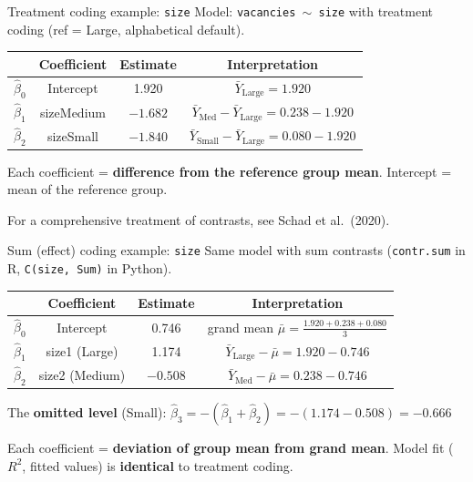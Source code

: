 \documentclass[10pt,ignorenonframetext,aspectratio=169]{beamer}
\begin{document}
\begin{frame}{Treatment coding example: \texttt{size}}
    Model: \texttt{vacancies $\sim$ size} with treatment coding (ref = Large, alphabetical default).

    \begin{table}[h]\centering\small
    \begin{tabular}{lccc}
    \hline
    & \textbf{Coefficient} & \textbf{Estimate} & \textbf{Interpretation} \\
    \hline
    $\hat{\beta}_0$ & Intercept & 1.920 & $\bar{Y}_{\text{Large}} = 1.920$ \\
    $\hat{\beta}_1$ & sizeMedium & $-1.682$ & $\bar{Y}_{\text{Med}} - \bar{Y}_{\text{Large}} = 0.238 - 1.920$ \\
    $\hat{\beta}_2$ & sizeSmall & $-1.840$ & $\bar{Y}_{\text{Small}} - \bar{Y}_{\text{Large}} = 0.080 - 1.920$ \\
    \hline
    \end{tabular}
    \end{table}

    \medskip
    Each coefficient = \textbf{difference from the reference group mean}. Intercept = mean of the reference group.

    \medskip
    \small For a comprehensive treatment of contrasts, see Schad et al.\ (2020).
\end{frame}

\begin{frame}{Sum (effect) coding example: \texttt{size}}
    Same model with sum contrasts (\texttt{contr.sum} in R, \texttt{C(size, Sum)} in Python).

    \begin{table}[h]\centering\small
    \begin{tabular}{lccc}
    \hline
    & \textbf{Coefficient} & \textbf{Estimate} & \textbf{Interpretation} \\
    \hline
    $\hat{\beta}_0$ & Intercept & 0.746 & grand mean $\bar{\mu} = \frac{1.920 + 0.238 + 0.080}{3}$ \\
    $\hat{\beta}_1$ & size1 (Large) & 1.174 & $\bar{Y}_{\text{Large}} - \bar{\mu} = 1.920 - 0.746$ \\
    $\hat{\beta}_2$ & size2 (Medium) & $-0.508$ & $\bar{Y}_{\text{Med}} - \bar{\mu} = 0.238 - 0.746$ \\
    \hline
    \end{tabular}
    \end{table}

    \medskip
    The \textbf{omitted level} (Small): $\hat{\beta}_3 = -(\hat{\beta}_1 + \hat{\beta}_2) = -(1.174 - 0.508) = -0.666$

    \medskip
    Each coefficient = \textbf{deviation of group mean from grand mean}. Model fit ($R^2$, fitted values) is \textbf{identical} to treatment coding.
\end{frame}
\end{document}
